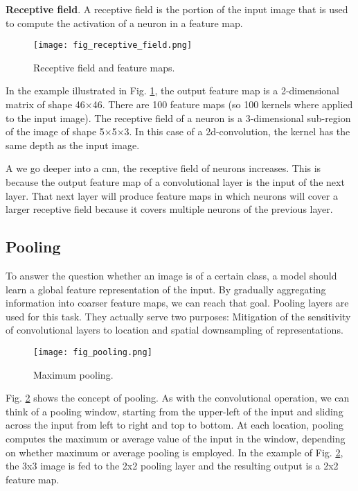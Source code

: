 \textbf{Receptive field}. A receptive field is the portion of the input image that is used to compute the activation of a neuron in a feature map.

\begin{figure}[ht]
    \begin{center}       
    \texttt{[image: fig\_receptive\_field.png]}
    \caption{Receptive field and feature maps.}
    \label{fig:receptive_field}
    \end{center}
\end{figure}

In the example illustrated in Fig. \ref{fig:receptive_field}, the output feature map is a 2-dimensional matrix of shape 46×46. There are 100 feature maps (so 100 kernels where applied to the input image). The receptive field of a neuron is a 3-dimensional sub-region of the image of shape 5×5×3. In this case of a 2d-convolution, the kernel has the same depth as the input image.

A we go deeper into a \acrshort{cnn}, the receptive field of neurons increases. This is because the output feature map of a convolutional layer is the input of the next layer. That next layer will produce feature maps in which neurons will cover a larger receptive field because it covers multiple neurons of the previous layer.

\subsection{Pooling}
To answer the question whether an image is of a certain class, a model should learn a global feature representation of the input. By gradually aggregating information into coarser feature maps, we can reach that goal. Pooling layers are used for this task. They actually serve two purposes: Mitigation of the sensitivity of convolutional layers to location and spatial downsampling of representations.

\begin{figure}[ht]
    \begin{center}       
    \texttt{[image: fig\_pooling.png]}
    \caption{Maximum pooling.}
    \label{fig:pooling}
    \end{center}
\end{figure}

Fig. \ref{fig:pooling} shows the concept of pooling. As with the convolutional operation, we can think of a pooling window, starting from the upper-left of the input and sliding across the input from left to right and top to bottom. At each location, pooling computes the maximum or average value of the input in the window, depending on whether maximum or average pooling is employed. In the example of Fig. \ref{fig:pooling}, the 3x3 image is fed to the 2x2 pooling layer and the resulting output is a 2x2 feature map.

